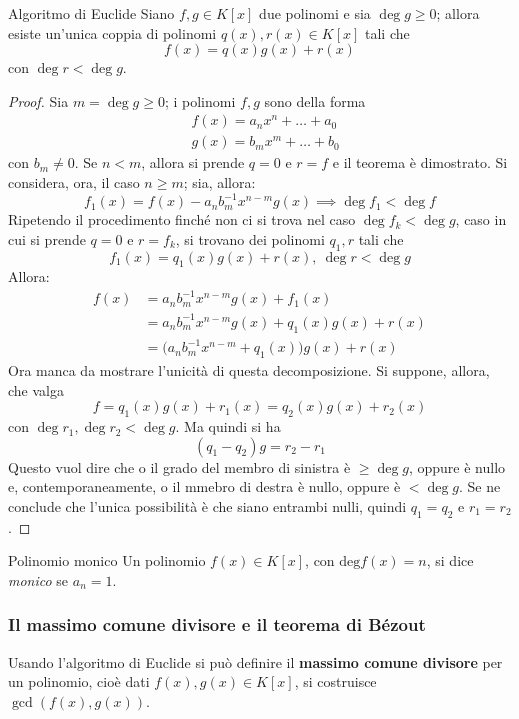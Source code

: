 \documentclass[11pt, a4paper]{scrartcl}
\theoremstyle{definition}
\numberwithin{esempio}{section}
\theoremstyle{definition}
\numberwithin{obs}{section}
\numberwithin{nota}{section}
\numberwithin{equation}{subsection}
\begin{document}
\begin{teorema}
	{Algoritmo di Euclide}{}
	Siano $f,g \in K[x]$ due polinomi e sia $\operatorname{deg} g \ge  0$; allora esiste un'unica coppia di polinomi $q(x),r(x) \in K[x]$ tali che
	\[
	f(x) = q(x) g(x) + r(x)
	\] 
	con $\operatorname{deg} r < \operatorname{deg} g$.
	\begin{proof}
		Sia $m = \operatorname{deg} g \ge 0$; i polinomi $f,g$ sono della forma
		\[
		\begin{split}
			&f(x) = a_nx^n + \ldots + a_0\\
			&g(x) = b_m x^m + \ldots + b_0
		\end{split}
		\] 
		con $b_m\neq 0 $.
		Se $n < m$, allora si prende $q = 0$ e $r = f$ e il teorema \`e dimostrato.
		Si considera, ora, il caso $n\ge  m$; sia, allora:
		\[
		f_1(x) = f(x) - a_n b_m^{-1} x^{n-m} g(x)\implies \operatorname{deg} f_1 < \operatorname{deg} f
		\] 
		Ripetendo il procedimento finch\'e non ci si trova nel caso $\operatorname{deg} f_k < \operatorname{deg} g$, caso in cui si prende $q=0 $ e $r=f_k$, si trovano dei polinomi $q_1, r$ tali che
		\[
		f_1(x) = q_1(x) g(x) + r(x), \ \operatorname{deg} r < \operatorname{deg} g
		\] 
		Allora:
		\[
		\begin{split}
			f(x)&=a_nb_m^{-1} x^{n-m} g(x) + f_1(x)\\
			    &=a_nb_m^{-1} x^{n-m} g(x) + q_1(x)g(x) + r(x)\\
			    &=\big(a_nb_m^{-1} x^{n-m} +q_1(x)\big)g(x) + r(x)
		\end{split}
		\] 
		Ora manca da mostrare l'unicit\`a di questa decomposizione.
		Si suppone, allora, che valga
		\[
		f = q_1 (x) g(x) + r_1(x) = q_2 (x) g(x) + r_2(x)
		\] 
		con $\operatorname{deg} r_1, \operatorname{deg} r_2 < \operatorname{deg} g$.
		Ma quindi si ha 
		\[
			(q_1-q_2)g  = r_2-r_1
		\] 
		Questo vuol dire che o il grado del membro di sinistra \`e $\ge \operatorname{deg} g$, oppure \`e nullo e, contemporaneamente, o il mmebro di destra \`e nullo, oppure \`e $< \operatorname{deg} g$.
		Se ne conclude che l'unica possibilit\`a \`e che siano entrambi nulli, quindi $q_1=q_2$ e $r_1=r_2$.
	\end{proof}
\end{teorema}
\begin{definizione}
	{Polinomio monico}{}
	Un polinomio $f(x) \in K[x]$, con $\mathrm{deg} f(x) = n$, si dice \textit{monico} se $a_n = 1$.
\end{definizione}
\subsubsection{Il massimo comune divisore e il teorema di B\'ezout}
Usando l'algoritmo di Euclide si pu\`o definire il \textbf{massimo comune divisore} per un polinomio, cio\`e dati $f(x),g(x) \in K[x]$, si costruisce $\operatorname{gcd}(f(x),g(x)) $.
\end{document}

